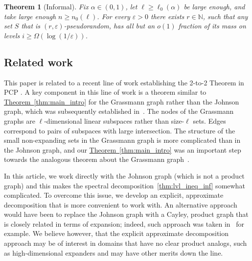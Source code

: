 \documentclass[11pt]{article}
\newcommand{\expref}[2]{\texorpdfstring{\hyperref[#2]{#1~\ref{#2}}}{#1~\ref{#2}}}
\newtheorem{theorem}{Theorem}[section]
\newcommand\eps{\varepsilon}
\renewcommand\geq{\geqslant}
\begin{document}
\begin{theorem}[Informal]\label{thm:lvl_ineq_inf}
  Fix $\alpha\in (0,1)$, let $\ell\geq\ell_0(\alpha)$ be large enough, and take large enough $n\geq n_0(\ell)$.
  For every $\eps>0$ there exists $r\in\mathbb{N}$, such that any set $S$ that is $(r,\eps)$-pseudorandom,
  has all but %
an $o(1)$ fraction  %
of its mass on levels $i\geq \Omega(\log(1/\eps))$.
\end{theorem}

%
%
\subsection{Related work}
This paper is related to a recent line of work establishing the 2-to-2 Theorem
in PCP \cite{KMS,DKKMS,DKKMSgras,KMS2}. A key component in this line of work is
a theorem similar to \expref{Theorem}{thm:main_intro} for the Grassmann graph rather than
the Johnson graph, which was subsequently established in~\cite{KMS2}. The nodes of
the Grassmann graphs are $\ell$-dimensional linear subspaces rather than size-$\ell$
sets. Edges correspond to %
%
pairs of subspaces with large intersection.  %
The structure of
the small non-expanding sets in the Grassmann graph is more complicated than
%
in   %
the Johnson graph, and our \expref{Theorem}{thm:main_intro} was an important step
towards the analogous theorem about the Grassmann graph~\cite{KMS2}.

In this %
article,   %
we work directly with the Johnson graph (which is not a product graph) and this makes the spectral decomposition~\eqref{thm:lvl_ineq_inf} somewhat complicated. To
overcome this issue, we develop an explicit, approximate decomposition that is more convenient to work with. An alternative approach would have been to replace the Johnson graph
with a Cayley, product graph that is closely related in terms of expansion; indeed, such approach was taken in~\cite{KMS2} for example. We believe however, that the explicit
approximate decomposition approach may be of interest in domains that have no clear product analogs,
such as high-dimensional expanders \cite{bafna2021hypercontractivity,gur2021hypercontractivity} and may have other merits down the line.
\end{document}

